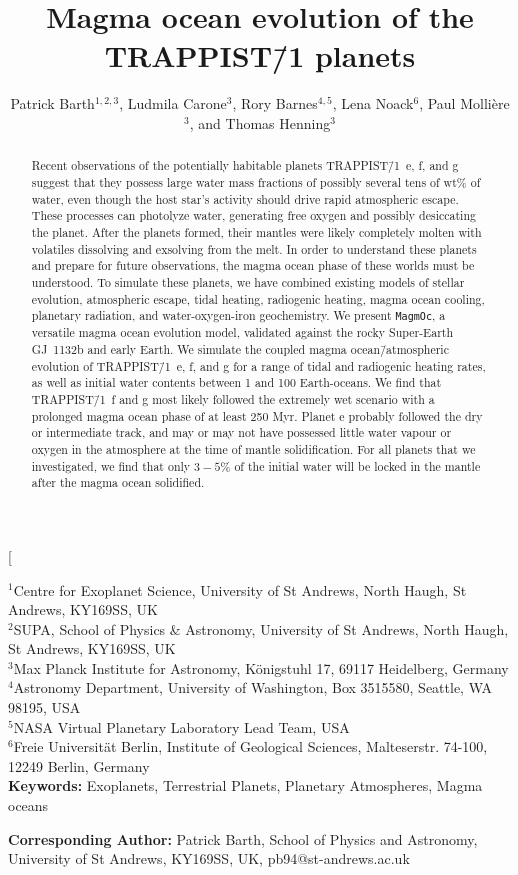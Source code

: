 \documentclass[oneside,twocolumn]{article}
\title{Magma ocean evolution of the TRAPPIST\=/1 planets}
\author{Patrick Barth$^{1,2,3}$, Ludmila Carone$^{3}$, Rory Barnes$^{4,5}$, Lena Noack$^{6}$, Paul Molli\`{e}re$^{3}$, and Thomas Henning$^{3}$}
\date{}
\newcommand{\magmoc}{\texttt{\footnotesize{MagmOc}}}
\begin{document}
 

\twocolumn[
\begin{@twocolumnfalse}
\maketitle

$^1$Centre for Exoplanet Science, University of St Andrews, North Haugh, St Andrews, KY169SS, UK \\
$^2$SUPA, School of Physics \& Astronomy, University of St Andrews, North Haugh, St Andrews, KY169SS, UK \\
$^3$Max Planck Institute for Astronomy, K\"onigstuhl 17, 69117 Heidelberg, Germany \\
$^4$Astronomy Department, University of Washington, Box 3515580, Seattle, WA 98195, USA \\
$^5$NASA Virtual Planetary Laboratory Lead Team, USA \\
$^6$Freie Universit\"at Berlin, Institute of Geological Sciences, Malteserstr. 74-100, 12249 Berlin, Germany \\

\textbf{Keywords:} Exoplanets, Terrestrial Planets, Planetary Atmospheres, Magma oceans

\textbf{Corresponding Author:} Patrick Barth, School of Physics and Astronomy, University of St Andrews, KY169SS, UK, pb94@st-andrews.ac.uk


\begin{abstract}

Recent observations of the potentially habitable planets TRAPPIST\=/1~e, f, and g suggest that they possess large water mass fractions of possibly several tens of wt\% of water, even though the host star's activity should drive rapid atmospheric escape. These processes can photolyze water, generating free oxygen and possibly desiccating the planet. After the planets formed, their mantles were likely completely molten with volatiles dissolving and exsolving from the melt. In order to understand these planets and prepare for future observations, the magma ocean phase of these worlds must be understood. To simulate these planets, we have combined existing models of stellar evolution, atmospheric escape, tidal heating, radiogenic heating, magma ocean cooling, planetary radiation, and water-oxygen-iron geochemistry. We present \magmoc{}, a versatile magma ocean evolution model, validated against the rocky Super-Earth GJ~1132b and early Earth. We simulate the coupled magma ocean\=/atmospheric evolution of TRAPPIST\=/1~e, f, and g for a range of tidal and radiogenic heating rates, as well as initial water contents between 1 and 100 Earth-oceans. We find that TRAPPIST\=/1~f and g most likely followed the extremely wet scenario with a prolonged magma ocean phase of at least 250 Myr. Planet e probably followed the dry or intermediate track, and may or may not have possessed little water vapour or oxygen in the atmosphere at the time of mantle solidification. For all planets that we investigated, we find that only $3-5\%$ of the initial water will be locked in the mantle after the magma ocean solidified. 
   

\end{abstract}
\end{@twocolumnfalse}
\end{document}
